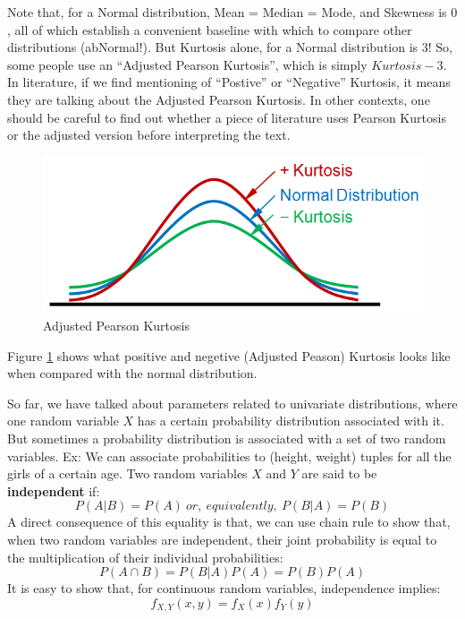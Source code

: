 Note that, for a Normal distribution, Mean = Median = Mode, and Skewness is $0$, all of which establish a convenient baseline with which to compare other distributions (abNormal!). But Kurtosis alone, for a Normal distribution is 3! So, some people use an ``Adjusted Pearson Kurtosis'', which is simply $Kurtosis - 3$. In literature, if we find mentioning of ``Postive'' or ``Negative'' Kurtosis, it means they are talking about the Adjusted Pearson Kurtosis. In other contexts, one should be careful to find out whether a piece of literature uses Pearson Kurtosis or the adjusted version before interpreting the text.
	\begin{figure}
	  \centering
	    \includegraphics[width=\textwidth]{Statistics/kurtosis}
	  \caption{Adjusted Pearson Kurtosis}
	  \label{fig:kurtosis}
	\end{figure}

Figure \ref{fig:kurtosis} shows what positive and negetive (Adjusted Peason) Kurtosis looks like when compared with the normal distribution.  

So far, we have talked about parameters related to univariate distributions, where one random variable $X$ has a certain probability distribution associated with it. But sometimes a probability distribution is associated with a set of two random variables. Ex: We can associate probabilities to (height, weight) tuples for all the girls of a certain age. Two random variables $X$ and $Y$ are said to be \textbf{independent} if:
	\[ P(A|B) = P(A)\ or,\ equivalently,\ P(B|A) = P(B) \]
A direct consequence of this equality is that, we can use chain rule to show that, when two random variables are independent, their joint probability is equal to the multiplication of their individual probabilities:
 	\[ P(A \cap B) = P(B|A)P(A) = P(B)P(A) \]
It is easy to show that, for continuous random variables, independence implies:
	\[ f_{X,Y}(x,y) = f_X(x)f_Y(y) \]

